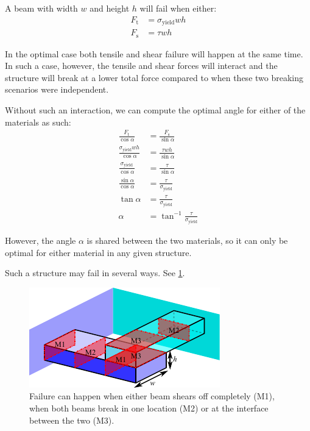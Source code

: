 A beam with width $w$ and height $h$ will fail when either:
\begin{align}
	F_\text{t} &= \sigma_\text{yield} w h \\
	F_\text{s} &= \tau w h 
\end{align}

In the optimal case both tensile and shear failure will happen at the same time.
In such a case, however, the tensile and shear forces will interact and the structure will break at a lower total force compared to when these two breaking scenarios were independent.

Without such an interaction, we can compute the optimal angle for either of the materials as such:
\begin{align}
	\frac{F_\text{t}}{\cos \alpha} &= \frac{F_\text{s}}{\sin \alpha} \\
	\frac{\sigma_\text{yield} w h}{\cos \alpha} &= \frac{\tau w h}{\sin \alpha} \\
	\frac{\sigma_\text{yield}}{\cos \alpha} &= \frac{\tau}{\sin \alpha} \\
	\frac{\sin \alpha}{\cos \alpha} &= \frac{\tau}{\sigma_\text{yield}} \\
	\tan \alpha &= \frac{\tau}{\sigma_\text{yield}} \\
	\alpha &= \tan^{-1} \frac{\tau}{\sigma_\text{yield}}
\end{align}

However, the angle $\alpha$ is shared between the two materials, so it can only be optimal for either material in any given structure.





Such a structure may fail in several ways.
See \cref{fig:failure_modes_diagonal}.

\begin{figure}
	\centering
	\includegraphics[width=.75\columnwidth]{sources/method/failure_modes_diagonal.pdf}
	\caption{Failure can happen when either beam shears off completely (M1), when both beams break in one location (M2) or at the interface between the two (M3).}
	\label{fig:failure_modes_diagonal}
\end{figure}









